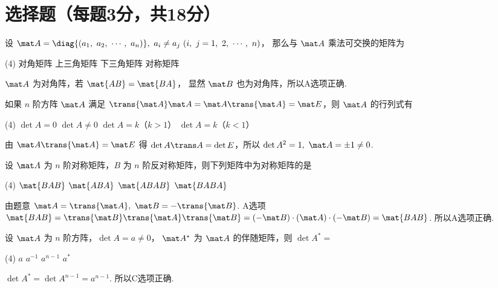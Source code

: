 \section{选择题（每题3分，共18分）}

\begin{problem}
  设 $\mat A = \diag{(a_1,~ a_2,~ \cdots,~ a_n)},~
      a_i \neq a_j~ (i,~ j = 1,~ 2,~ \cdots,~ n)$，
  那么与 $\mat A$ 乘法可交换的矩阵为
  \begin{tasks}(4)
    \task[\true] 对角矩阵
    \task 上三角矩阵
    \task 下三角矩阵
    \task 对称矩阵
  \end{tasks}
\end{problem}
\scratch
\begin{solution}
  $\mat A$ 为对角阵，若 $\mat{AB} = \mat{BA}$，
  显然 $\mat B$ 也为对角阵，所以A选项正确.
\end{solution}

\begin{problem}
  如果 $n$ 阶方阵 $\mat A$ 满足 $\trans{\mat A} \mat A =
  \mat A \trans{\mat A} = \mat E$，则 $\mat A$ 的行列式有
  \begin{tasks}(4)
    \task $\det A = 0$
    \task[\true] $\det A \neq 0$
    \task $\det A = k$（$k > 1$）
    \task $\det A = k$（$k < 1$）
  \end{tasks}
\end{problem}
\scratch
\begin{solution}
  由 $\mat A \trans{\mat A} = \mat E$ 得
  $\det{A \trans A} = \det E$，所以
  $\det A^2 = 1,~ \mat A = \pm1 \neq 0$.
\end{solution}

\begin{problem}
  设 $\mat A$ 为 $n$ 阶对称矩阵，$B$ 为 $n$ 阶反对称矩阵，则下列矩阵中为对称矩阵的是
  \begin{tasks}(4)
    \task[\true] $\mat{BAB}$
    \task $\mat{ABA}$
    \task $\mat{ABAB}$
    \task $\mat{BABA}$
  \end{tasks}
\end{problem}
\scratch
\begin{solution}
  由题意
  $\mat A = \trans{\mat A},~ \mat B = -\trans{\mat B}$.
  A选项
  $ \mat{BAB} = \trans{\mat B} \trans{\mat A} \trans{\mat B}
  = (-\mat B) \cdot (\mat A) \cdot (-\mat B) = \mat{BAB}$. 所以A选项正确.
\end{solution}

\begin{problem}
  设 $\mat A$ 为 $n$ 阶方阵，$\det A = a \neq 0$，
  $\mat A^*$ 为 $\mat A$ 的伴随矩阵，则 $\det{A^*} = $
  \begin{tasks}(4)
    \task $a$
    \task $a^{-1}$
    \task[\true] $a^{n-1}$
    \task $a^*$
  \end{tasks}
\end{problem}
\scratch
\begin{solution}
  $\det{A^*} = \det A^{n-1} = a^{n-1}$. 所以C选项正确.
\end{solution}

